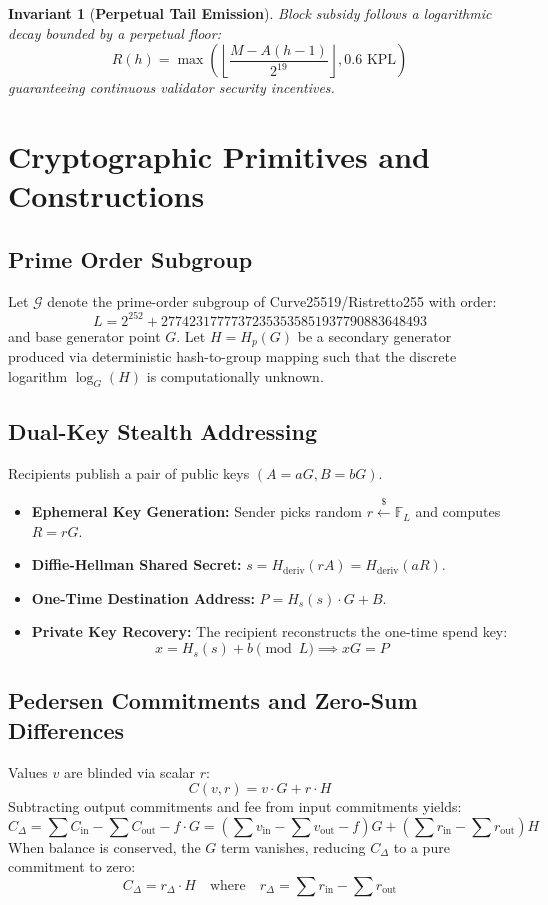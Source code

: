 \documentclass[11pt,a4paper]{article}
\newtheorem{invariant}{Invariant}
\begin{document}
\begin{invariant}[\textbf{Perpetual Tail Emission}]
Block subsidy follows a logarithmic decay bounded by a perpetual floor:
\begin{equation}
R(h) = \max\left( \left\lfloor \frac{M - A(h-1)}{2^{19}} \right\rfloor, 0.6 \text{ KPL} \right)
\end{equation}
guaranteeing continuous validator security incentives.
\end{invariant}

\section{Cryptographic Primitives and Constructions}

\subsection{Prime Order Subgroup}
Let $\mathcal{G}$ denote the prime-order subgroup of Curve25519/Ristretto255 with order:
\[
L = 2^{252} + 27742317777372353535851937790883648493
\]
and base generator point $G$. Let $H = H_p(G)$ be a secondary generator produced via deterministic hash-to-group mapping such that the discrete logarithm $\log_G(H)$ is computationally unknown.

\subsection{Dual-Key Stealth Addressing}
Recipients publish a pair of public keys $(A = aG, B = bG)$.
\begin{itemize}
    \item \textbf{Ephemeral Key Generation:} Sender picks random $r \xleftarrow{\$} \mathbb{F}_L$ and computes $R = rG$.
    \item \textbf{Diffie-Hellman Shared Secret:} $s = H_{\text{deriv}}(rA) = H_{\text{deriv}}(aR)$.
    \item \textbf{One-Time Destination Address:} $P = H_s(s) \cdot G + B$.
    \item \textbf{Private Key Recovery:} The recipient reconstructs the one-time spend key:
    \[
    x = H_s(s) + b \pmod L \implies xG = P
    \]
\end{itemize}

\subsection{Pedersen Commitments and Zero-Sum Differences}
Values $v$ are blinded via scalar $r$:
\[
C(v, r) = v \cdot G + r \cdot H
\]
Subtracting output commitments and fee from input commitments yields:
\[
C_{\Delta} = \sum C_{\text{in}} - \sum C_{\text{out}} - f \cdot G = \left(\sum v_{\text{in}} - \sum v_{\text{out}} - f\right)G + \left(\sum r_{\text{in}} - \sum r_{\text{out}}\right)H
\]
When balance is conserved, the $G$ term vanishes, reducing $C_\Delta$ to a pure commitment to zero:
\[
C_{\Delta} = r_{\Delta} \cdot H \quad \text{where} \quad r_{\Delta} = \sum r_{\text{in}} - \sum r_{\text{out}}
\]
\end{document}
